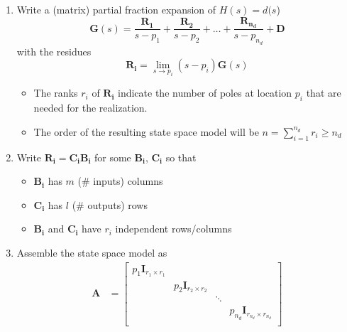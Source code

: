 \newpar{}
\begin{enumerate}
    \item Write a (matrix) partial fraction expansion of $H(s)=d(s$)
          \begin{equation*}
              \mathbf{G}(s)=\frac{\mathbf{R_1}}{s-p_1}+\frac{\mathbf{R_2}}{s-p_2}+\ldots+\frac{\mathbf{R_{n_d}}}{s-p_{n_d}}+\mathbf{D}
          \end{equation*} with the residues
          \begin{equation*}
              \mathbf{R_i}=\lim_{s\to p_i}(s-p_i)\mathbf{G}(s)
          \end{equation*}
          \begin{itemize}
              \item The ranks $r_i$ of $\mathbf{R_i}$ indicate the number of poles at location $p_i$ that are needed for the realization.
              \item The order of the resulting state space model will be $n=\sum_{i=1}^{n_d}r_i\geq n_d$
          \end{itemize}
    \item Write $\mathbf{R_i}=\mathbf{C_i B_i}$ for some $\mathbf{B_i}$, $\mathbf{C_i}$ so that
          \begin{itemize}
              \item $\mathbf{B_i}$ has $m$ (\# inputs) columns
              \item $\mathbf{C_i}$ has $l$ (\# outputs) rows
              \item $\mathbf{B_i}$ and $\mathbf{C_i}$ have $r_i$ independent rows/columns
          \end{itemize}
    \item Assemble the state space model as
          \begin{align*}
              \mathbf{A} & =\begin{bmatrix}
                                p_1 \mathbf{I}_{r_1\times r_1} &                                &        &                                            \\
                                                               & p_2 \mathbf{I}_{r_2\times r_2} &        &                                            \\
                                                               &                                & \ddots &                                            \\
                                                               &                                &        & p_{n_d} \mathbf{I}_{r_{n_d}\times r_{n_d}} \\

\end{bmatrix}
\end{align*}
\end{enumerate}
